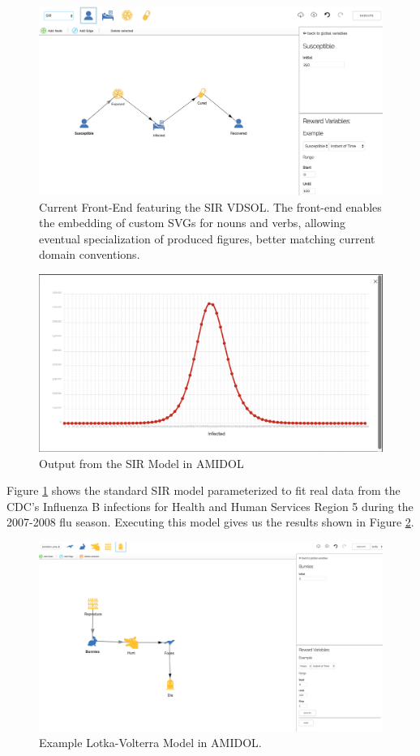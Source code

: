 \documentclass[11pt]{article}
\newcommand{\amidol}{\textsc{AMIDOL}}
\begin{document}
\begin{figure}
\includegraphics[width=\textwidth]{figs/AMIDOL-UI.png}
\caption{Current Front-End featuring the SIR VDSOL.  The front-end enables the embedding of custom SVGs for nouns and verbs, allowing eventual specialization of produced figures, better matching current domain conventions.}
\label{Fig:Editor}
\end{figure}

\begin{figure}
  \includegraphics[width=\textwidth]{figs/SIR-output.png}
\caption{Output from the SIR Model in \amidol{}}
\label{Fig:SIROut}
\end{figure}


Figure \ref{Fig:Editor} shows the standard SIR model parameterized to fit real data from the CDC's Influenza B infections for Health and Human Services Region 5 during the 2007-2008 flu season.  Executing this model gives us the results shown in Figure \ref{Fig:SIROut}.

\begin{figure}
\includegraphics[width=\textwidth]{figs/Lotka-Volterra.png}
\caption{Example Lotka-Volterra Model in \amidol{}.}
\label{Fig:Lotka}
\end{figure}
\end{document}
